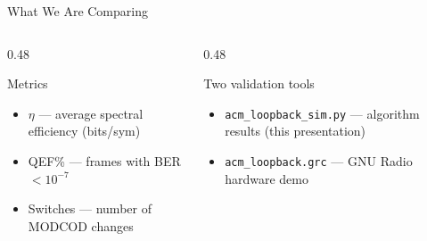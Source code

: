 \documentclass[aspectratio=169,10pt]{beamer}
\begin{document}
\begin{frame}{What We Are Comparing}
\vspace{0.8em}
\begin{columns}[T]
  \begin{column}{0.48\textwidth}
    \begin{keybox}{Metrics}
      \begin{itemize}\small
        \item $\eta$ — average spectral efficiency (bits/sym)
        \item QEF\% — frames with BER $< 10^{-7}$
        \item Switches — number of MODCOD changes
      \end{itemize}
    \end{keybox}
  \end{column}
  \begin{column}{0.48\textwidth}
    \begin{notebox}{Two validation tools}
      \begin{itemize}\small
        \item \texttt{acm\_loopback\_sim.py} — algorithm results (this presentation)
        \item \texttt{acm\_loopback.grc} — GNU Radio hardware demo
      \end{itemize}
    \end{notebox}
  \end{column}
\end{columns}
\end{frame}
\end{document}

